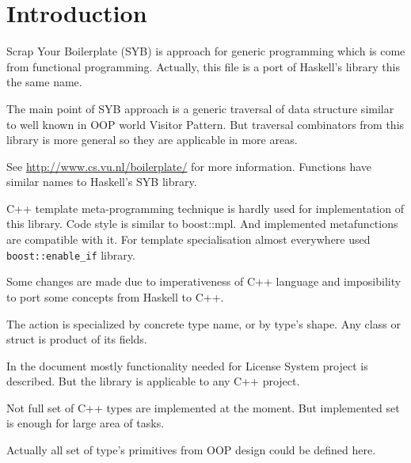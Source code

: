 \section{Introduction}

Scrap Your Boilerplate (SYB) is approach for generic programming which is come from functional programming.
Actually, this file is a port of Haskell's library this the same name.

The main point of SYB approach is a generic traversal of data structure similar to well known in OOP world Visitor Pattern.
But traversal combinators from this library is more general so they are applicable in more areas.

See \url{http://www.cs.vu.nl/boilerplate/} for more information. Functions have similar names to Haskell's SYB library.

C++ template meta-programming technique is hardly used for implementation of this library.
Code style is similar to boost::mpl. And implemented metafunctions are compatible with it.
For template specialisation almost everywhere used \lstinline$boost::enable_if$ library.

Some changes are made due to imperativeness of C++ language and imposibility to port some concepts from Haskell to C++.

The action is specialized by concrete type name, or by type's shape.
Any class or struct is product of its fields. 

In the document mostly functionality needed for License System project is described. But the library is applicable to any C++ project.

Not full set of C++ types are implemented at the moment. But implemented set is enough for large area of tasks.

Actually all set of type's primitives from OOP design could be defined here.


